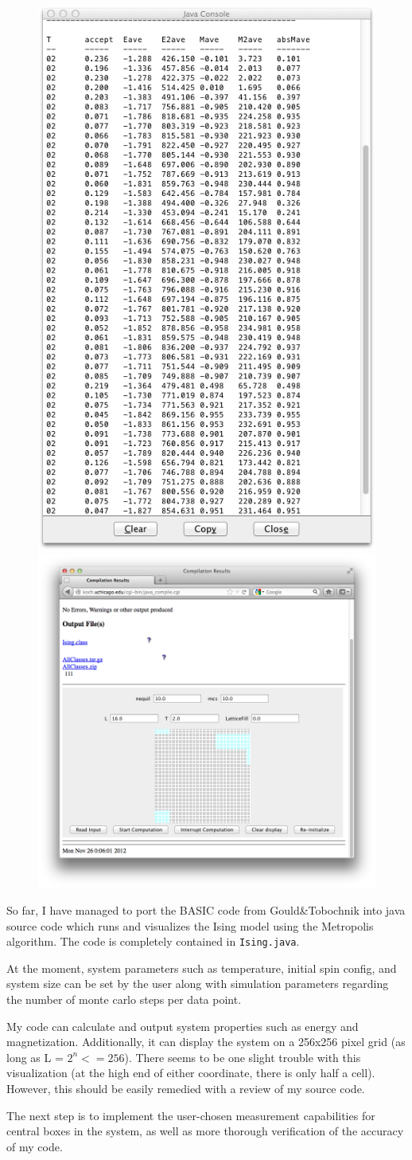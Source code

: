 \documentclass[aps,letterpaper,10pt]{article}
\newcommand{\ttt}{\texttt}
\begin{document}
\begin{figure}[!h]
\includegraphics[width=.48\textwidth]{console.png}
\includegraphics[width=.48\textwidth]{applet.png}
\end{figure}

So far, I have managed to port the BASIC code from Gould\&Tobochnik into java source code which runs and visualizes the Ising model using the Metropolis algorithm. The code is completely contained in \ttt{Ising.java}.

At the moment, system parameters such as temperature, initial spin config, and system size can be set by the user along with simulation parameters regarding the number of monte carlo steps per data point.

My code can calculate and output system properties such as energy and magnetization. Additionally, it can display the system on a 256x256 pixel grid (as long as L = $2^n <= 256$). There seems to be one slight trouble with this visualization (at the high end of either coordinate, there is only half a cell). However, this should be easily remedied with a review of my source code.

The next step is to implement the user-chosen measurement capabilities for central boxes in the system, as well as more thorough verification of the accuracy of my code.
\end{document}
